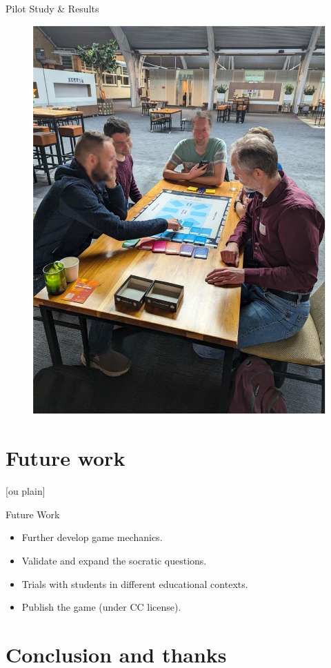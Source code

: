 \documentclass[aspectratio=169]{beamer}
\begin{document}
\begin{frame}{Pilot Study \& Results}
    \begin{figure}
        \centering
        \includegraphics[width=0.4\linewidth]{images//Imagen1.jpg}
    \end{figure}
\end{frame}

\section{Future work}

[ou plain]
\begin{frame}{Future Work}
    \begin{itemize}
        \item Further develop game mechanics.
        \item Validate and expand the socratic questions.
        \item Trials with students in different educational contexts.
        \item Publish the game (under CC license).
    \end{itemize}
\end{frame}

\section{Conclusion and thanks}

\end{document}

